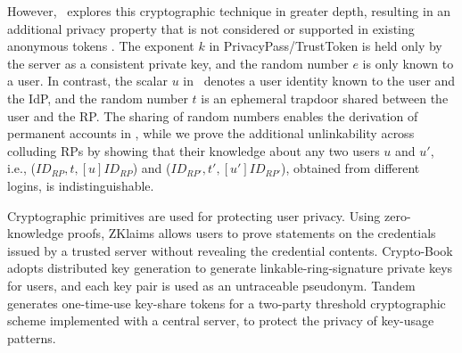 However, \usso\ explores this cryptographic technique %
in greater depth, resulting in an additional privacy property that is not considered or supported in existing anonymous tokens \cite{privacypass,trusttoken}. %
The exponent $k$ in PrivacyPass/TrustToken is held only by the server as a consistent private key, and the random number $e$ is only known to a user. In contrast, the scalar $u$ in \usso\ denotes a user identity known to the user and the IdP, and the random number $t$ is an ephemeral trapdoor shared between the user and the RP.
The sharing of random numbers enables the derivation of permanent accounts in \usso,
 while we prove the additional unlinkability across colluding RPs by showing that their knowledge about any two users $u$ and $u'$, i.e., ($ID_{RP}, t, [u]ID_{RP}$) and ($ID_{RP'}, t', [u']ID_{RP'}$), obtained from different logins, is indistinguishable.



\oldc
Cryptographic primitives are used for protecting user privacy.
Using zero-knowledge proofs, ZKlaims \cite{zklaim} allows users to prove statements on the credentials issued by a trusted server without revealing the credential contents.
Crypto-Book \cite{crypto-book} adopts distributed key generation to generate linkable-ring-signature private keys for users, and each key pair is used as an untraceable pseudonym. Tandem \cite{tandem} generates one-time-use key-share tokens for a two-party threshold cryptographic scheme implemented with a central server, to protect the privacy of key-usage patterns.



